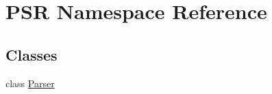 \hypertarget{namespacePSR}{\section{\-P\-S\-R \-Namespace \-Reference}
\label{namespacePSR}
}
\subsection*{\-Classes}
\begin{DoxyCompactItemize}
\item 
class \hyperlink{classPSR_1_1Parser}{\-Parser}
\end{DoxyCompactItemize}

